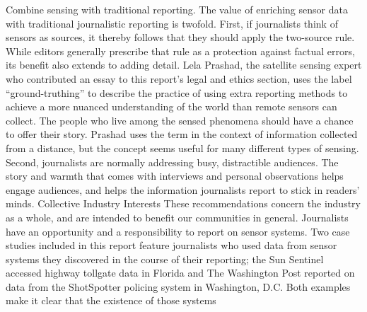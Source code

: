 Combine sensing with traditional reporting.
The value of enriching sensor data with traditional journalistic reporting
is twofold. First, if journalists think of sensors as sources, it thereby follows
that they should apply the two-source rule. While editors generally
prescribe that rule as a protection against factual errors, its benefit also
extends to adding detail. Lela Prashad, the satellite sensing expert who
contributed an essay to this report's legal and ethics section, uses the label
``ground-truthing'' to describe the practice of using extra reporting methods
to achieve a more nuanced understanding of the world than remote sensors
can collect. The people who live among the sensed phenomena should have
a chance to offer their story. Prashad uses the term in the context of information
collected from a distance, but the concept seems useful for many
different types of sensing.
Second, journalists are normally addressing busy, distractible audiences.
The story and warmth that comes with interviews and personal observations
helps engage audiences, and helps the information journalists report
to stick in readers' minds.
Collective Industry Interests
These recommendations concern the industry as a whole, and are intended
to benefit our communities in general.
Journalists have an opportunity and a responsibility to report on
sensor systems.
Two case studies included in this report feature journalists who used data
from sensor systems they discovered in the course of their reporting; the
Sun Sentinel accessed highway tollgate data in Florida and The Washington
Post reported on data from the ShotSpotter policing system in Washington,
D.C. Both examples make it clear that the existence of those systems

